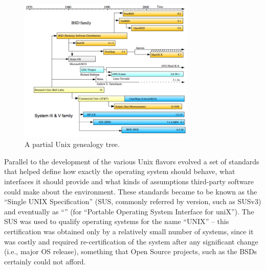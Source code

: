 \begin{figure}[t]
	\centering
	\includegraphics[width=0.75\textwidth]{02/pics/unix_history}
	\caption[Unix genealogy tree]{A partial Unix genealogy tree.
		\label{fig:unix-history}}
\end{figure}

Parallel to the development of the various Unix
flavors evolved a set of standards that helped define
how exactly the operating system should behave, what
interfaces it should provide and what kinds of
assumptions third-party software could make about the
environment.  These standards became to be known as
the ``Single UNIX Specification'' (SUS, commonly referred by version,
such as SUSv3) and eventually as
``'' (for
``Portable Operating System Interface for uniX'').
The SUS was used to qualify operating systems for the
name ``\textsc{UNIX}'' -- this
certification was obtained only by a relatively small
number of systems, since it was costly and required
re-certification of the system after any significant
change (i.e., major OS release), something that Open
Source projects, such as the BSDs certainly could not
afford.

